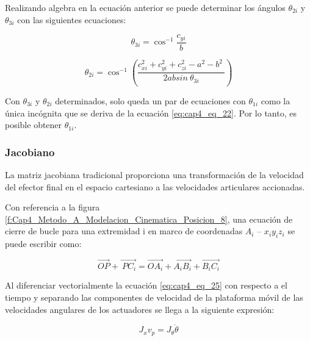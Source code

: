     Realizando algebra en la ecuación anterior se puede determinar los ángulos $\theta_{2i}$ y $\theta_{3i}$ con las siguientes ecuaciones: 
    
    \begin{equation}
       \theta _{3i}= \cos ^{-1}\frac{c_{yi}}{b} 
        \label{eq:cap4_eq_23}
    \end{equation}
     
    \begin{equation}
    \theta _{2i}=\cos ^{-1} \left( \frac{c_{xi}^{2}+c_{yi}^{2}+c_{zi}^{2}-a^{2}-b^{2}~}{2ab sin~ \theta _{3i}} \right) 
     \label{eq:cap4_eq_24}
    \end{equation}
    
    
    Con $\theta _{3i}$ y $\theta_{2i}$ determinados, solo queda un par de ecuaciones con $\theta_{1i}$ como la única incógnita que se deriva de la ecuación \ref{eq:cap4_eq_22}. Por lo tanto, es posible obtener $\theta_{1i}$.

    
        \newpage

        \subsubsection{Jacobiano}\label{ma_jac}
        
        La matriz jacobiana tradicional proporciona una transformación de la velocidad del efector final en el espacio cartesiano a las velocidades articulares accionadas.

        Con referencia a la figura \ref{f:Cap4_Metodo_A_Modelacion_Cinematica_Posicion_8}, una ecuación de cierre de bucle para una extremidad i en marco de coordenadas  \( A_{i} \) – \( x_{i}y_{i}z_{i} \) se puede escribir como:
        
        \begin{equation}
             \overrightarrow{OP}+\overrightarrow{~PC_{i}} =\overrightarrow{OA_{i}}+\overrightarrow{A_{i}B_{i}}+\overrightarrow{B_{i}C_{i}}  
         \label{eq:cap4_eq_25}
        \end{equation}

        Al diferenciar vectorialmente la ecuación \ref{eq:cap4_eq_25} con respecto a el tiempo y separando las componentes de velocidad de la plataforma móvil de las velocidades angulares de los actuadores se llega a la siguiente expresión:
        
        \begin{equation}
            J_{x}v_{p}=J_{ \theta }\dot{ \theta } 
            \label{eq:cap4_eq_26}
        \end{equation}
        
